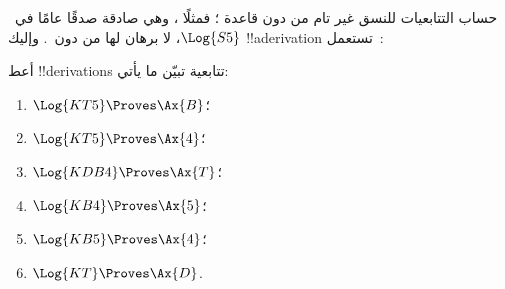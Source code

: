 \documentclass[../../../include/open-logic-section]{subfiles}
\begin{document}
\begin{ex}
حساب التتابعيات للنسق  غير تام من دون قاعدة \Cut{}؛ فمثلًا
، وهي صادقة صدقًا عامًا في~$\Log{S5}$، لا برهان لها
من دون~\Cut. وإليك !!a{derivation} تستعمل~\Cut:
\begin{prooftree}
\end{prooftree}
\end{ex}

\begin{prob}
أعط !!{derivation}s تتابعية تبيّن ما يأتي:
  \begin{enumerate}
  \item $\Log{KT5} \Proves \Ax{B}$؛
  \item $\Log{KT5} \Proves \Ax{4}$؛
  \item $\Log{KDB4} \Proves \Ax{T}$؛
  \item $\Log{KB4} \Proves \Ax{5}$؛
  \item $\Log{KB5} \Proves \Ax{4}$؛
  \item $\Log{KT} \Proves \Ax{D}$.
  \end{enumerate}
\end{prob}
\end{document}
